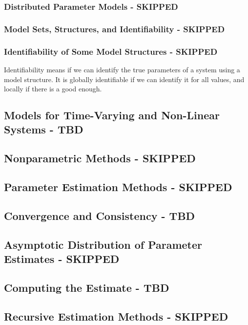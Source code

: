 \subsubsection{Distributed Parameter Models - SKIPPED}
\subsubsection{Model Sets, Structures, and Identifiability - SKIPPED}

\subsubsection{Identifiability of Some Model Structures - SKIPPED}
Identifiability means if we can identify the true parameters of a system using a model structure.
It is globally identifiable if we can identify it for all values,
and locally if there is a good enough.
\subsection{Models for Time-Varying and Non-Linear Systems - TBD}





\subsection{Nonparametric Methods - SKIPPED}

\subsection{Parameter Estimation Methods - SKIPPED}

\subsection{Convergence and Consistency - TBD}

\subsection{Asymptotic Distribution of Parameter Estimates - SKIPPED}

\subsection{Computing the Estimate - TBD}

\subsection{Recursive Estimation Methods - SKIPPED}


